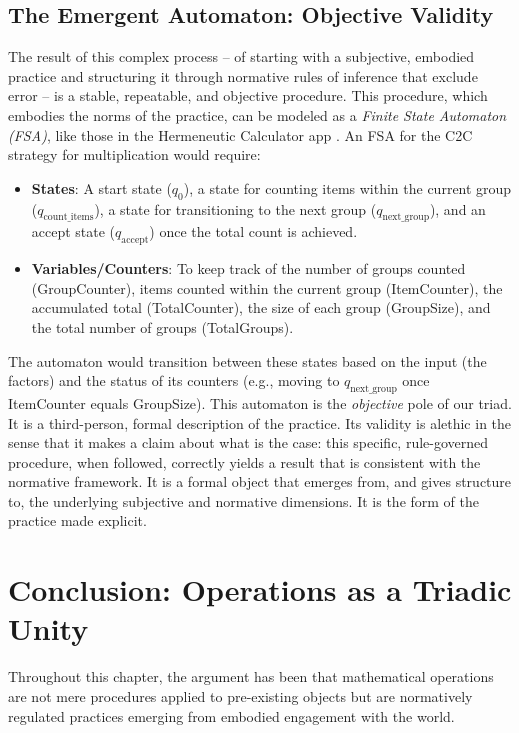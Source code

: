 \documentclass[12pt]{book}
\begin{document}
\subsection{The Emergent Automaton: Objective Validity}

The result of this complex process -- of starting with a subjective, embodied practice and structuring it through normative rules of inference that exclude error -- is a stable, repeatable, and objective procedure. This procedure, which embodies the norms of the practice, can be modeled as a \textit{Finite State Automaton (FSA)}, like those in the Hermeneutic Calculator app \parencite{savich_hermeneutic_nodate}. An FSA for the C2C strategy for multiplication would require:

\begin{itemize}
 \item \textbf{States}: A start state (\(q_0\)), a state for counting items within the current group (\(q_{\text{count\_items}}\)), a state for transitioning to the next group (\(q_{\text{next\_group}}\)), and an accept state (\(q_{\text{accept}}\)) once the total count is achieved.
 \item \textbf{Variables/Counters}: To keep track of the number of groups counted (GroupCounter), items counted within the current group (ItemCounter), the accumulated total (TotalCounter), the size of each group (GroupSize), and the total number of groups (TotalGroups).
\end{itemize}

The automaton would transition between these states based on the input (the factors) and the status of its counters (e.g., moving to \(q_{\text{next\_group}}\) once ItemCounter equals GroupSize). This automaton is the \textit{objective} pole of our triad. It is a third-person, formal description of the practice. Its validity is alethic in the sense that it makes a claim about what is the case: this specific, rule-governed procedure, when followed, correctly yields a result that is consistent with the normative framework. It is a formal object that emerges from, and gives structure to, the underlying subjective and normative dimensions. It is the form of the practice made explicit.

\section{Conclusion: Operations as a Triadic Unity}

Throughout this chapter, the argument has been that mathematical operations are not mere procedures applied to pre-existing objects but are normatively regulated practices emerging from embodied engagement with the world.
\end{document}
